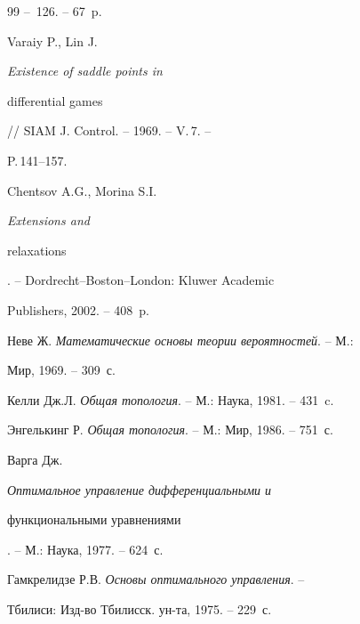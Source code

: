 \begin{thebibliography}{99}
-- \No\,126. -- 67~p.




Varaiy P., Lin J. {\em Existence of saddle points in


differential games} // SIAM J. Control. -- 1969. -- V.\,7. --


P.\,141--157.




Chentsov A.G., Morina S.I. {\em Extensions and


relaxations}. -- Dordrecht--Boston--London: Kluwer Academic


Publishers, 2002. -- 408~p.




Неве Ж. {\em Математические основы теории вероятностей}. -- М.:


Мир, 1969. -- 309~с.




Келли Дж.Л. {\em Общая топология}. -- М.: Наука, 1981. -- 431~c.




Энгелькинг Р. {\em Общая топология}. -- М.: Мир, 1986. -- 751~с.




Варга Дж. {\em Оптимальное управление дифференциальными и


функциональными уравнениями}. -- М.: Наука, 1977. -- 624~с.




Гамкрелидзе Р.В. {\em Основы оптимального управления}. --


Тбилиси: Изд-во Тбилисск. ун-та, 1975. -- 229~с.





\end{thebibliography}





\vskip 2cm














\label{end}





